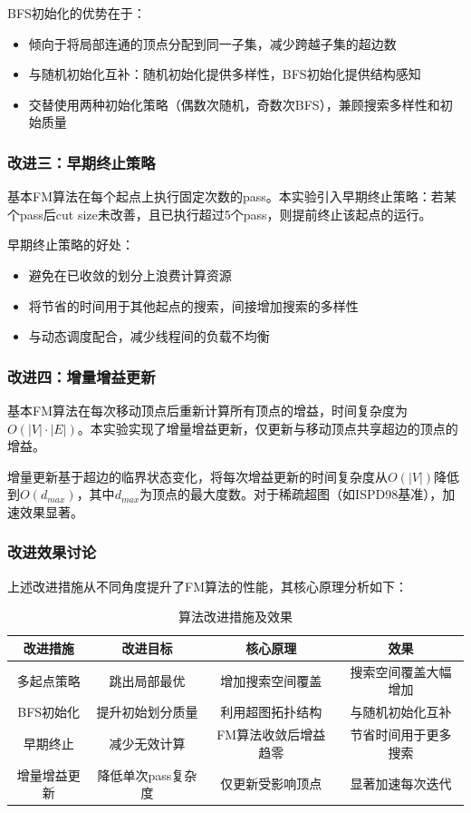 \documentclass{SYSUReport}
\begin{document}
BFS初始化的优势在于：
\begin{itemize}
\item 倾向于将局部连通的顶点分配到同一子集，减少跨越子集的超边数
\item 与随机初始化互补：随机初始化提供多样性，BFS初始化提供结构感知
\item 交替使用两种初始化策略（偶数次随机，奇数次BFS），兼顾搜索多样性和初始质量
\end{itemize}

\subsubsection{改进三：早期终止策略}
基本FM算法在每个起点上执行固定次数的pass。本实验引入早期终止策略：若某个pass后cut size未改善，且已执行超过5个pass，则提前终止该起点的运行。

早期终止策略的好处：
\begin{itemize}
\item 避免在已收敛的划分上浪费计算资源
\item 将节省的时间用于其他起点的搜索，间接增加搜索的多样性
\item 与动态调度配合，减少线程间的负载不均衡
\end{itemize}

\subsubsection{改进四：增量增益更新}
基本FM算法在每次移动顶点后重新计算所有顶点的增益，时间复杂度为$O(|V| \cdot |E|)$。本实验实现了增量增益更新，仅更新与移动顶点共享超边的顶点的增益。

增量更新基于超边的临界状态变化，将每次增益更新的时间复杂度从$O(|V|)$降低到$O(d_{max})$，其中$d_{max}$为顶点的最大度数。对于稀疏超图（如ISPD98基准），加速效果显著。

\subsubsection{改进效果讨论}
上述改进措施从不同角度提升了FM算法的性能，其核心原理分析如下：

\begin{table}[H]
\centering
\caption{算法改进措施及效果}
\begin{tabular}{|c|c|c|c|}
\hline
改进措施 & 改进目标 & 核心原理 & 效果 \\
\hline
多起点策略 & 跳出局部最优 & 增加搜索空间覆盖 & 搜索空间覆盖大幅增加 \\
\hline
BFS初始化 & 提升初始划分质量 & 利用超图拓扑结构 & 与随机初始化互补 \\
\hline
早期终止 & 减少无效计算 & FM算法收敛后增益趋零 & 节省时间用于更多搜索 \\
\hline
增量增益更新 & 降低单次pass复杂度 & 仅更新受影响顶点 & 显著加速每次迭代 \\
\hline
\end{tabular}
\end{table}
\end{document}
